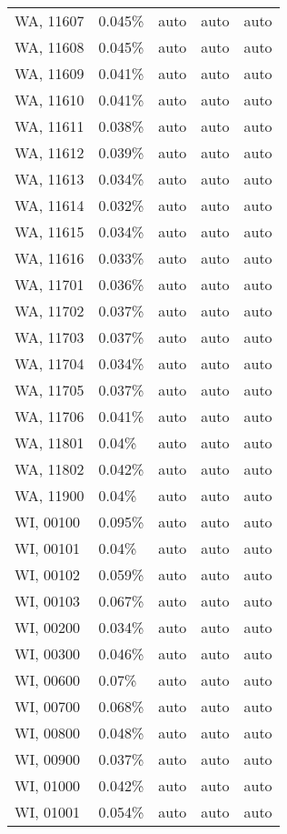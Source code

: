 \begin{longtable}[]{@{}lllll@{}}
WA, 11607 & 0.045\% & auto & auto & auto \\
WA, 11608 & 0.045\% & auto & auto & auto \\
WA, 11609 & 0.041\% & auto & auto & auto \\
WA, 11610 & 0.041\% & auto & auto & auto \\
WA, 11611 & 0.038\% & auto & auto & auto \\
WA, 11612 & 0.039\% & auto & auto & auto \\
WA, 11613 & 0.034\% & auto & auto & auto \\
WA, 11614 & 0.032\% & auto & auto & auto \\
WA, 11615 & 0.034\% & auto & auto & auto \\
WA, 11616 & 0.033\% & auto & auto & auto \\
WA, 11701 & 0.036\% & auto & auto & auto \\
WA, 11702 & 0.037\% & auto & auto & auto \\
WA, 11703 & 0.037\% & auto & auto & auto \\
WA, 11704 & 0.034\% & auto & auto & auto \\
WA, 11705 & 0.037\% & auto & auto & auto \\
WA, 11706 & 0.041\% & auto & auto & auto \\
WA, 11801 & 0.04\% & auto & auto & auto \\
WA, 11802 & 0.042\% & auto & auto & auto \\
WA, 11900 & 0.04\% & auto & auto & auto \\
WI, 00100 & 0.095\% & auto & auto & auto \\
WI, 00101 & 0.04\% & auto & auto & auto \\
WI, 00102 & 0.059\% & auto & auto & auto \\
WI, 00103 & 0.067\% & auto & auto & auto \\
WI, 00200 & 0.034\% & auto & auto & auto \\
WI, 00300 & 0.046\% & auto & auto & auto \\
WI, 00600 & 0.07\% & auto & auto & auto \\
WI, 00700 & 0.068\% & auto & auto & auto \\
WI, 00800 & 0.048\% & auto & auto & auto \\
WI, 00900 & 0.037\% & auto & auto & auto \\
WI, 01000 & 0.042\% & auto & auto & auto \\
WI, 01001 & 0.054\% & auto & auto & auto \\

\end{longtable}
